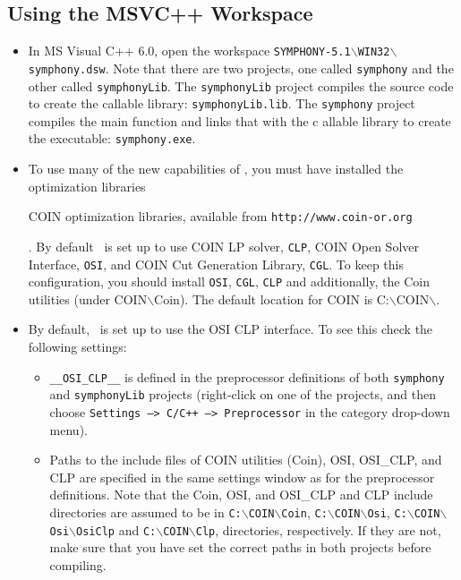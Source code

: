 \subsection{Using the MSVC++ Workspace}

\begin{itemize}

\item In MS Visual C++ 6.0, open the workspace
\texttt{SYMPHONY-5.1$\backslash$WIN32$\backslash$symphony.dsw}. 
Note that there are two projects, one called \texttt{symphony} and the other 
called
\texttt{symphonyLib}. The \texttt{symphonyLib} project compiles the source 
code to create the callable library: \texttt{symphonyLib.lib}. The 
\texttt{symphony} project compiles the main  function and links that with the c
allable library to create the executable: \texttt{symphony.exe}. 

\item To use many of the new capabilities of \BB, you must have installed
the  optimization
libraries 
\begin{latexonly} 
COIN optimization libraries, available from
\texttt{http://www.coin-or.org} 
\end{latexonly}. By default \BB\ is 
set up to use COIN LP solver, \texttt{CLP}, COIN Open Solver Interface, 
\texttt{OSI}, and COIN Cut Generation Library, \texttt{CGL}. To keep this 
configuration, you should install \texttt{OSI}, \texttt{CGL}, \texttt{CLP} 
and additionally, the Coin utilities (under COIN$\backslash$Coin).
The default location for COIN is C:$\backslash$COIN$\backslash$.

\item By default, \BB\ is set up to use the OSI CLP interface. To see this
check the following settings:

\begin{itemize}

\item \texttt{\_\_OSI\_CLP\_\_} is defined in the preprocessor
definitions of both \texttt{symphony} and \texttt{symphonyLib} projects 
(right-click on one of the projects, and then choose \texttt{Settings --> C/C++
--> Preprocessor} in the category drop-down menu).

\item Paths to the include files of COIN utilities (Coin), OSI, OSI\_CLP, and
CLP are specified in the same settings window as for the preprocessor
definitions. Note that the Coin, OSI, and OSI\_CLP and CLP include 
directories are assumed to be in \texttt{C:$\backslash$COIN$\backslash$Coin},
\texttt{C:$\backslash$COIN$\backslash$Osi},
\texttt{C:$\backslash$COIN$\backslash$Osi$\backslash$OsiClp} and 
\texttt{C:$\backslash$COIN$\backslash$Clp},
directories, respectively. If they are not, make sure that you have set the
correct paths in both projects before compiling.


\end{itemize}
\end{itemize}
